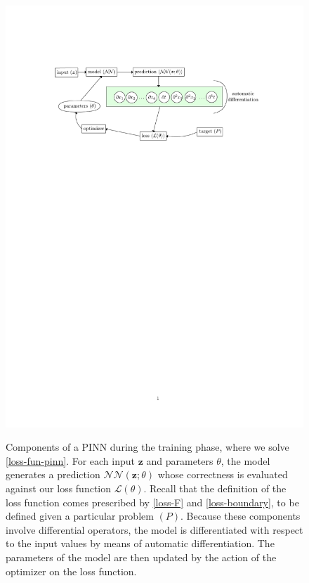 \documentclass[12pt]{report} %
\newcommand{\tmmathbf}[1]{\ensuremath{\boldsymbol{#1}}}
\begin{document}
\begin{figure}[ht]
    \centering
    {\includegraphics[width=\textwidth, clip=true, trim={3cm 20cm 3cm 4cm}]{imagenes/autodiffgraph.pdf}}
    \caption{Components of a PINN during the training phase, where we solve \eqref{loss-fun-pinn}. For each input $\tmmathbf{z}$ and parameters $\theta$, the model generates a prediction $\mathcal{NN}(\tmmathbf{z};\theta)$ whose correctness is evaluated against our loss function $\mathcal{L}(\theta)$. Recall that the definition of the loss function comes prescribed by \eqref{loss-F} and \eqref{loss-boundary}, to be defined given a particular problem $(P)$. Because these components involve differential operators, the model is differentiated with respect to the input values by means of automatic differentiation. The parameters of the model are then updated by the action of the optimizer on the loss function. %
    }\label{fig:autodiffgraph}
\end{figure}
\end{document}
